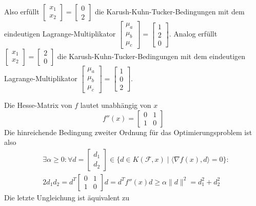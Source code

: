 \begin{compactenum}[(i)]
Also erfüllt $\begin{bmatrix}x_1\\x_2\end{bmatrix}=\begin{bmatrix}0\\2\end{bmatrix}$ die Karush-Kuhn-Tucker-Bedingungen mit dem eindeutigen Lagrange-Multiplikator $\begin{bmatrix}\mu_a\\\mu_b\\\mu_c\end{bmatrix}=\begin{bmatrix}1\\2\\0\end{bmatrix}$. Analog erfüllt $\begin{bmatrix}x_1\\x_2\end{bmatrix}=\begin{bmatrix}2\\0\end{bmatrix}$ die Karush-Kuhn-Tucker-Bedingungen mit dem eindeutigen Lagrange-Multiplikator $\begin{bmatrix}\mu_a\\\mu_b\\\mu_c\end{bmatrix}=\begin{bmatrix}1\\0\\2\end{bmatrix}$.\newpage
\item Die Hesse-Matrix von $f$ lautet unabhängig von $x$
$$f''(x)=\begin{bmatrix}0&1\\1&0\end{bmatrix}$$
Die hinreichende Bedingung zweiter Ordnung für das Optimierungsproblem ist also
\begin{align*}&\exists \alpha\geq 0: \forall d=\begin{bmatrix}d_1\\d_2\end{bmatrix}\in \{d\in K(\mathcal F, x)\mid\langle \nabla f(x),d\rangle=0\}:\\ &2d_1d_2=d^T\begin{bmatrix}0&1\\1&0\end{bmatrix}d=d^Tf''(x)d\geq\alpha\|d\|^2=d_1^2+d_2^2\end{align*}
Die letzte Ungleichung ist äquivalent zu

\end{compactenum}
